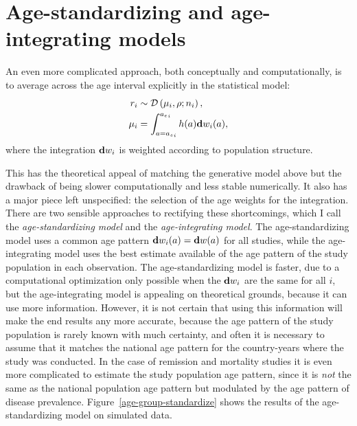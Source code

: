 \section{Age-standardizing and age-integrating models}
\label{age-standardizing}
An even more complicated approach, both conceptually and
computationally, is to average across the age interval explicitly in
the statistical model:
\begin{align*}
r_i &\sim \mathcal{D}\left(\mu_i, \rho; n_i\right),\\
\mu_i &= \int_{a={a_s}_i}^{{a_e}_i} h(a)\mathbf{d} w_i(a),
\end{align*}
where the integration $\mathbf{d} w_i$ is weighted according to population
structure.

This has the theoretical appeal of matching the generative model above
but the drawback of being slower computationally and less stable
numerically.  It also has a major piece left unspecified: the
selection of the age weights for the integration.  There are two
sensible approaches to rectifying these shortcomings, which I call the \emph{age-standardizing
  model} and the \emph{age-integrating model}.  The age-standardizing
model uses a common age pattern $\mathbf{d} w_i(a) = \mathbf{d} w(a)$ for all studies, while
the age-integrating model uses the best estimate available of the age
pattern of the study population in each observation.  The
age-standardizing model is faster, due to a computational optimization
only possible when the $\mathbf{d} w_i$ are the same for all $i$, but the
age-integrating model is appealing on theoretical grounds, because it
can use more information.  However, it is not certain that
using this information will make the end results any more accurate,
because the age pattern of the study population is rarely known with
much certainty, and often it is necessary to assume that it matches
the national age pattern for the country-years where the study was
conducted.  In the case of remission and mortality studies it is even
more complicated to estimate the study population age pattern, since
it is \emph{not} the same as the national population age pattern but
modulated by the age pattern of disease prevalence.
Figure~\ref{age-group-standardize} shows the results of the age-standardizing model on
simulated data.

